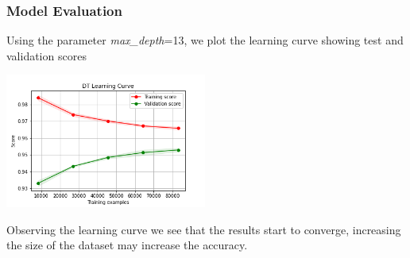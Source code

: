 \subsubsection{Model Evaluation}

Using the parameter \emph{max_depth}=13, we plot the learning curve showing test and validation scores

\begin{center}
    \captionsetup{type=figure}
    \includegraphics[width=250px]{learning_curve_DT.png}
\end{center}

Observing the learning curve we see that the results start to converge, increasing the size of the dataset may increase the accuracy.


